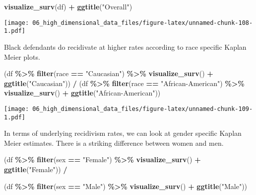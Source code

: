 \documentclass[
]{book}
\newenvironment{Shaded}{\begin{snugshade}}{\end{snugshade}}
\newcommand{\KeywordTok}[1]{\textcolor[rgb]{0.13,0.29,0.53}{\textbf{#1}}}
\newcommand{\NormalTok}[1]{#1}
\newcommand{\OperatorTok}[1]{\textcolor[rgb]{0.81,0.36,0.00}{\textbf{#1}}}
\newcommand{\StringTok}[1]{\textcolor[rgb]{0.31,0.60,0.02}{#1}}
\begin{document}
\begin{Shaded}
\begin{Highlighting}[]
\KeywordTok{visualize\_surv}\NormalTok{(df) }\OperatorTok{+}\StringTok{ }\KeywordTok{ggtitle}\NormalTok{(}\StringTok{"Overall"}\NormalTok{)}
\end{Highlighting}
\end{Shaded}

\texttt{[image: 06\_high\_dimensional\_data\_files/figure-latex/unnamed-chunk-108-1.pdf]}

Black defendants do recidivate at higher rates according to race specific Kaplan Meier plots.

\begin{Shaded}
\begin{Highlighting}[]
\NormalTok{(df }\OperatorTok{\%\textgreater{}\%}\StringTok{ }\KeywordTok{filter}\NormalTok{(race }\OperatorTok{==}\StringTok{ "Caucasian"}\NormalTok{) }\OperatorTok{\%\textgreater{}\%}\StringTok{ }\KeywordTok{visualize\_surv}\NormalTok{() }\OperatorTok{+}\StringTok{ }\KeywordTok{ggtitle}\NormalTok{(}\StringTok{"Caucasian"}\NormalTok{)) }\OperatorTok{/}
\NormalTok{(df }\OperatorTok{\%\textgreater{}\%}\StringTok{ }\KeywordTok{filter}\NormalTok{(race }\OperatorTok{==}\StringTok{ "African{-}American"}\NormalTok{) }\OperatorTok{\%\textgreater{}\%}\StringTok{ }\KeywordTok{visualize\_surv}\NormalTok{() }\OperatorTok{+}\StringTok{ }\KeywordTok{ggtitle}\NormalTok{(}\StringTok{"African{-}American"}\NormalTok{)) }
\end{Highlighting}
\end{Shaded}

\texttt{[image: 06\_high\_dimensional\_data\_files/figure-latex/unnamed-chunk-109-1.pdf]}

In terms of underlying recidivism rates, we can look at gender specific Kaplan Meier estimates. There is a striking difference between women and men.

\begin{Shaded}
\begin{Highlighting}[]
\NormalTok{(df }\OperatorTok{\%\textgreater{}\%}\StringTok{ }\KeywordTok{filter}\NormalTok{(sex }\OperatorTok{==}\StringTok{ "Female"}\NormalTok{) }\OperatorTok{\%\textgreater{}\%}\StringTok{ }\KeywordTok{visualize\_surv}\NormalTok{() }\OperatorTok{+}\StringTok{ }\KeywordTok{ggtitle}\NormalTok{(}\StringTok{"Female"}\NormalTok{)) }\OperatorTok{/}

\NormalTok{(df }\OperatorTok{\%\textgreater{}\%}\StringTok{ }\KeywordTok{filter}\NormalTok{(sex }\OperatorTok{==}\StringTok{ "Male"}\NormalTok{) }\OperatorTok{\%\textgreater{}\%}\StringTok{ }\KeywordTok{visualize\_surv}\NormalTok{() }\OperatorTok{+}\StringTok{ }\KeywordTok{ggtitle}\NormalTok{(}\StringTok{"Male"}\NormalTok{))}
\end{Highlighting}
\end{Shaded}
\end{document}

